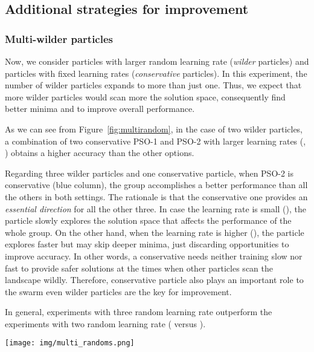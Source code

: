 \documentclass{ieeeaccess}
\begin{document}
\subsection{Additional strategies for improvement}
\subsubsection{Multi-wilder particles}
Now, we consider particles with larger random learning rate (\emph{wilder} particles) and particles with fixed learning rates (\emph{conservative} particles). In this experiment, the number of wilder particles expands to more than just one. Thus, we expect that more wilder particles would scan more the solution space, consequently find better minima and to improve overall performance.


As we can see from Figure~\ref{fig:multirandom}, in the case of two wilder particles, a combination of two conservative PSO-1 and PSO-2 with larger learning rates (, ) obtains a higher accuracy than the other options.

Regarding three wilder particles and one conservative particle, when PSO-2 is conservative (blue column), the group accomplishes a better performance than all the others in both settings. The rationale is that the conservative one provides an \emph{essential direction} for all the other three. In case the learning rate is small (), the particle slowly explores the solution space that affects the performance of the whole group. On the other hand, when the learning rate is higher (), the particle explores faster but may skip deeper minima, just discarding opportunities to improve accuracy. In other words, a conservative needs neither training slow nor fast to provide safer solutions at the times when other particles scan the landscape wildly. Therefore, conservative particle also plays an important role to the swarm even wilder particles are the key for improvement.

In general, experiments with three random learning rate outperform the experiments with two random learning rate ( versus ).
\begin{figure*}[htb!]
\begin{center}
\texttt{[image: img/multi\_randoms.png]}
\caption{Multi-random learning rates. The accuracy for experiments with two and three random particles. The latter is tested in two different settings. In each experiment, the columns from left to right hand side indicate PSO-1, PSO-2, PSO-3 and PSO-4 in order. When PSO-1, PSO-2 and PSO-3 are conservative the learning rates are set at ,  and , respectively. The PSO-4’s learning rate is always in a random range. Green columns denote random PSOs whereas blue columns represent conservative ones.}
\label{fig:multirandom}
\end{center}
\end{figure*}
\end{document}
